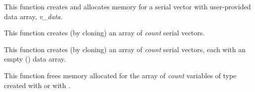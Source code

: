 \documentclass[letterpaper,10pt,english]{sphinxmanual}
\begin{document}

\begin{fulllineitems}
\label{nvectors/NVector_Serial:c.N_VMake_Serial}
This function creates and allocates memory for a serial vector with
user-provided data array, \emph{v\_data}.

\end{fulllineitems}


\begin{fulllineitems}
\label{nvectors/NVector_Serial:c.N_VCloneVectorArray_Serial}
This function creates (by cloning) an array of \emph{count} serial
vectors.

\end{fulllineitems}


\begin{fulllineitems}
\label{nvectors/NVector_Serial:c.N_VCloneEmptyVectorArray_Serial}
This function creates (by cloning) an array of \emph{count} serial
vectors, each with an empty () data array.

\end{fulllineitems}


\begin{fulllineitems}
\label{nvectors/NVector_Serial:c.N_VDestroyVectorArray_Serial}
This function frees memory allocated for the array of \emph{count}
variables of type  created with
{\hyperref[nvectors/NVector_Serial:c.N_VCloneVectorArray_Serial]{\emph{}}} or with
{\hyperref[nvectors/NVector_Serial:c.N_VCloneEmptyVectorArray_Serial]{\emph{}}}.

\end{fulllineitems}

\end{document}

